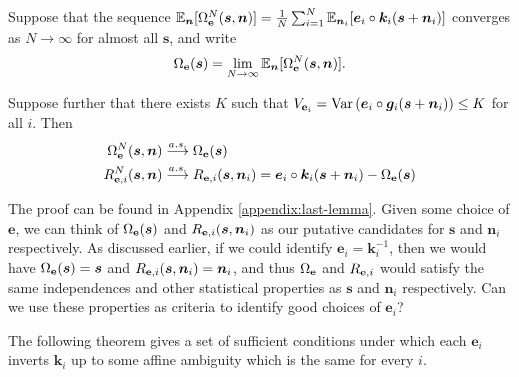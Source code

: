 \documentclass[letterpaper]{article}
\theoremstyle{definition}
\begin{document}
\begin{lemma}\label{lem:last-lemma}
Suppose that the sequence $\mathbb{E}_{\bm{n}}[\Omega_{\mathbf{e}}^N(\bm{s}, \bm{n})] = \frac{1}{N}\sum_{i=1}^N \mathbb{E}_{\bm{n}_i}[\bm{e}_i\circ \bm{k}_i( \bm{s} + \bm{n}_i)] $ converges as $N \to \infty$ for almost all $\bm{s}$, and write
\begin{align*}
    \Omega_{\mathbf{e}}(\bm{s}) = \lim_{N\to\infty}\mathbb{E}_{\bm{n}}[\Omega_{\mathbf{e}}^N(\bm{s}, \bm{n})].
\end{align*}

Suppose further that there exists $K$ such that $V_{\mathbf{e}_i} = \mathrm{Var}\left(\bm{e}_i \circ \bm{g}_i(\bm{s} + \bm{n}_i) \right) \leq K$ for all $i$.
Then
\begin{align*}
    \Omega_{\mathbf{e}}^N(\bm{s}, \bm{n}) & \overset{a.s.}{\longrightarrow} \Omega_{\mathbf{e}}(\bm{s}) \\
    R_{\mathbf{e}, i}^N(\bm{s}, \bm{n}) & \overset{a.s.}{\longrightarrow} R_{\mathbf{e}, i}(\bm{s}, \bm{n}_i) = \bm{e}_i\circ \bm{k}_i( \bm{s} + \bm{n}_i) - \Omega_{\mathbf{e}}(\bm{s})
\end{align*}
\end{lemma}

The proof can be found in Appendix \ref{appendix:last-lemma}.
Given some choice of $\bm{e}$, we can think of $\Omega_{\mathbf{e}}(\bm{s})$ and $R_{\mathbf{e}, i}(\bm{s}, \bm{n}_i)$ as our putative candidates for $\bm{s}$ and $\bm{n}_i$ respectively.
As discussed earlier, if we could identify $\bm{e}_i=\bm{k}_i^{-1}$, then we would have $\Omega_{\mathbf{e}}(\bm{s}) = \bm{s}$ and $R_{\mathbf{e}, i}(\bm{s}, \bm{n}_i) = \bm{n}_i$, and thus $\Omega_{\mathbf{e}}$ and $R_{\mathbf{e}, i}$ would satisfy the same independences and other statistical properties as $\bm{s}$ and $\bm{n}_i$ respectively.
Can we use these properties as criteria to identify good choices of $\bm{e}_i$?

The following theorem gives a set of sufficient conditions under which each $\bm{e}_i$ inverts $\bm{k}_i$ up to some affine ambiguity which is the same for every $i$.
\end{document}
